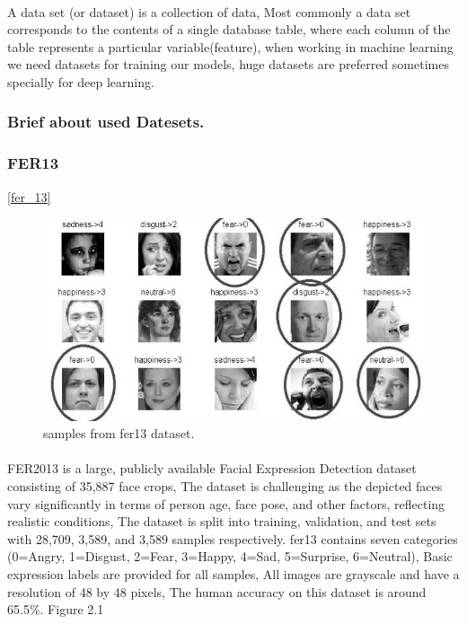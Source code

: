 \paragraph{}
A data set (or dataset) is a collection of data, Most commonly a data set corresponds to the contents of a single database table, where each column of the table represents a particular variable(feature), when working in machine learning we need datasets for training our models, huge datasets are preferred sometimes specially for deep learning.

\subsubsection{Brief about used Datesets.}
\subsubsection{FER13}
\ref{fer_13}
\begin{figure}
	\centering
	\includegraphics[width=.5\textwidth]{images/fer2013.jpg}
	\caption{samples from fer13 dataset.}
\end{figure} 
\paragraph{}
FER2013 is a large, publicly available Facial Expression Detection dataset consisting of 35,887 face crops, The dataset is challenging as the depicted faces vary significantly in terms of person age, face pose, and other factors, reflecting realistic conditions, 
The dataset is split into training, validation, and test sets with 28,709, 3,589, and 3,589 samples respectively.\newline
fer13 contains seven categories (0=Angry, 1=Disgust, 2=Fear, 3=Happy, 4=Sad, 5=Surprise, 6=Neutral), Basic expression labels are provided for all samples, All images are grayscale and have a resolution of 48 by 48 pixels, The human accuracy on this dataset is around 65.5\%. Figure 2.1
 
